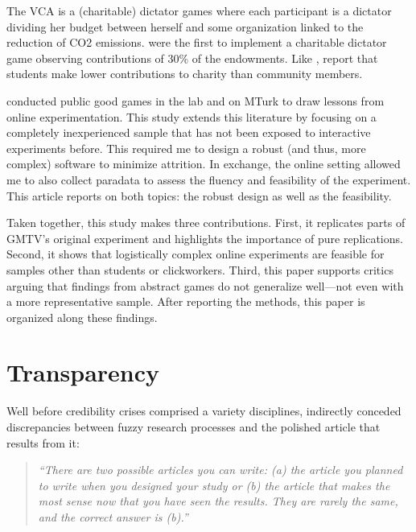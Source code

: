\documentclass[
  authoryear,
  preprint,
  3p]{elsarticle}
\begin{document}
The VCA is a (charitable) dictator games where each participant is a
dictator dividing her budget between herself and some organization
linked to the reduction of CO2 emissions. \citet{EckelGrossman1996} were
the first to implement a charitable dictator game observing
contributions of 30\% of the endowments. Like \citet{GKLS2020},
\citet{CarpenterEtAl2008} report that students make lower contributions
to charity than community members.

\citet{AGM2018} conducted public good games in the lab and on MTurk to
draw lessons from online experimentation. This study extends this
literature \citep[see also][ \citet{AmirEtAl2012}]{GoodmanPaolacci2017}
by focusing on a completely inexperienced sample that has not been
exposed to interactive experiments before. This required me to design a
robust (and thus, more complex) software to minimize attrition. In
exchange, the online setting allowed me to also collect paradata to
assess the fluency and feasibility of the experiment. This article
reports on both topics: the robust design as well as the feasibility.

Taken together, this study makes three contributions. First, it
replicates parts of GMTV's original experiment and highlights the
importance of pure replications. Second, it shows that logistically
complex online experiments are feasible for samples other than students
or clickworkers. Third, this paper supports critics arguing that
findings from abstract games do not generalize well---not even with a
more representative sample. After reporting the methods, this paper is
organized along these findings.

\hypertarget{transparency}{%
\section{Transparency}\label{transparency}}

Well before credibility crises comprised a variety disciplines,
\citet[p.~2]{bemwriting} indirectly conceded discrepancies between fuzzy
research processes and the polished article that results from it:

\begin{quote}
\emph{``There are two possible articles you can write: (a) the article
you planned to write when you designed your study or (b) the article
that makes the most sense now that you have seen the results. They are
rarely the same, and the correct answer is (b).''}
\end{quote}
\end{document}
